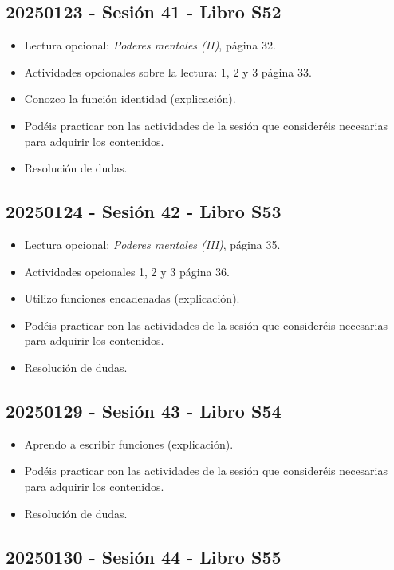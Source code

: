 \documentclass[a4paper,12pt]{article}
\begin{document}
\subsection{20250123 - Sesión 41 - Libro S52}

\begin{itemize}
    \item Lectura opcional: \textit{Poderes mentales (II)}, página 32.
    \item Actividades opcionales sobre la lectura: 1, 2 y 3 página 33.
    \item Conozco la función identidad (explicación).
    \item Podéis practicar con las actividades de la sesión que consideréis necesarias para adquirir los contenidos.
    \item Resolución de dudas.
\end{itemize}

\subsection{20250124 - Sesión 42 - Libro S53}

\begin{itemize}
    \item Lectura opcional: \textit{Poderes mentales (III)}, página 35.
    \item Actividades opcionales 1, 2 y 3 página 36.
    \item Utilizo funciones encadenadas (explicación).
    \item Podéis practicar con las actividades de la sesión que consideréis necesarias para adquirir los contenidos.
    \item Resolución de dudas.
\end{itemize}

\subsection{20250129 - Sesión 43 - Libro S54}

\begin{itemize}
    \item Aprendo a escribir funciones (explicación).
    \item Podéis practicar con las actividades de la sesión que consideréis necesarias para adquirir los contenidos.
    \item Resolución de dudas.
\end{itemize}

\subsection{20250130 - Sesión 44 - Libro S55}
\end{document}
